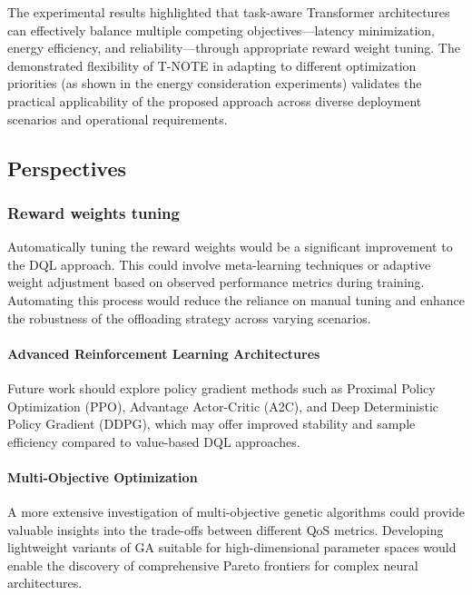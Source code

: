\documentclass[preprint,3p,authoryear]{elsarticle}
\begin{document}
The experimental results highlighted that task-aware Transformer architectures can effectively balance multiple competing objectives—latency minimization, energy efficiency, and reliability—through appropriate reward weight tuning. The demonstrated flexibility of T-NOTE in adapting to different optimization priorities (as shown in the energy consideration experiments) validates the practical applicability of the proposed approach across diverse deployment scenarios and operational requirements.

\subsection{Perspectives}


\subsubsection{Reward weights tuning}

Automatically tuning the reward weights would be a significant improvement to the DQL approach. This could involve meta-learning techniques or adaptive weight adjustment based on observed performance metrics during training. Automating this process would reduce the reliance on manual tuning and enhance the robustness of the offloading strategy across varying scenarios.


\paragraph{Advanced Reinforcement Learning Architectures}
Future work should explore policy gradient methods such as Proximal Policy Optimization (PPO), Advantage Actor-Critic (A2C), and Deep Deterministic Policy Gradient (DDPG), which may offer improved stability and sample efficiency compared to value-based DQL approaches.


\paragraph{Multi-Objective Optimization}
A more extensive investigation of multi-objective genetic algorithms could provide valuable insights into the trade-offs between different QoS metrics. Developing lightweight variants of GA suitable for high-dimensional parameter spaces would enable the discovery of comprehensive Pareto frontiers for complex neural architectures.



  
 
\end{document}
